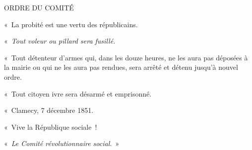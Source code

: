 \documentclass[french,twoside]{book} %
\newenvironment{quoteblock}%
  {\begin{quoting}}
  {\end{quoting}}
\newenvironment{quotebar}{%
    \def\FrameCommand{{\color{rubric!10!}\vrule width 0.5em} \hspace{0.9em}}%
    \def\OuterFrameSep{\itemsep} %
    \MakeFramed {\advance\hsize-\width \FrameRestore}
  }%
  {%
    \endMakeFramed
  }
\renewenvironment{quoteblock}%
  {%
    \savenotes
    \setstretch{0.9}
    \normalfont
    \begin{quotebar}
  }
  {%
    \end{quotebar}
    \spewnotes
  }
\begin{document}
\begin{quoteblock}
 \noindent ORDRE DU COMITÉ\par
 « La probité est une vertu des républicains.\par
 « \emph{Tout voleur ou pillard sera fusillé.}\par
 « Tout détenteur d’armes qui, dans les douze heures, ne les aura pas déposées à la mairie ou qui ne les aura pas rendues, sera arrêté et détenu jusqu’à nouvel ordre.\par
 « Tout citoyen ivre sera désarmé et emprisonné.\par
 « Clamecy, 7 décembre 1851.\par
 « Vive la République sociale !\par
 « \emph{Le Comité révolutionnaire social.} »
 \end{quoteblock}
\end{document}
